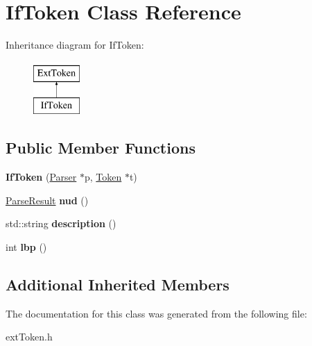 \hypertarget{classIfToken}{\section{If\-Token Class Reference}
\label{classIfToken}
}
Inheritance diagram for If\-Token\-:\begin{figure}[H]
\begin{center}
\leavevmode
\includegraphics[height=2.000000cm]{classIfToken}
\end{center}
\end{figure}
\subsection*{Public Member Functions}
\begin{DoxyCompactItemize}
\item 
\hypertarget{classIfToken_a607028595b06b8a950000ba3e82329db}{{\bfseries If\-Token} (\hyperlink{classParser}{Parser} $\ast$p, \hyperlink{classToken}{Token} $\ast$t)}\label{classIfToken_a607028595b06b8a950000ba3e82329db}

\item 
\hypertarget{classIfToken_add06bd79ce755fd5503f78e507109e52}{\hyperlink{classParseResult}{Parse\-Result} {\bfseries nud} ()}\label{classIfToken_add06bd79ce755fd5503f78e507109e52}

\item 
\hypertarget{classIfToken_aad226162c5649920c13c2a9e9e7a3617}{std\-::string {\bfseries description} ()}\label{classIfToken_aad226162c5649920c13c2a9e9e7a3617}

\item 
\hypertarget{classIfToken_abfd39ff4c4818d382bf0b97fd097c478}{int {\bfseries lbp} ()}\label{classIfToken_abfd39ff4c4818d382bf0b97fd097c478}

\end{DoxyCompactItemize}
\subsection*{Additional Inherited Members}


The documentation for this class was generated from the following file\-:\begin{DoxyCompactItemize}
\item 
ext\-Token.\-h\end{DoxyCompactItemize}
